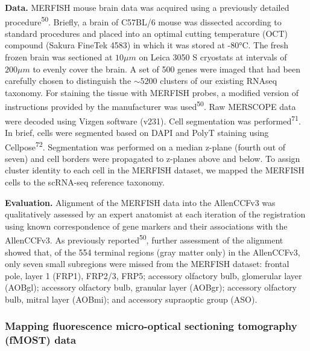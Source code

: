 \documentclass[
  12pt,
]{article}
\begin{document}
\textbf{Data.} MERFISH mouse brain data was acquired using a previously
detailed procedure\textsuperscript{50}. Briefly, a brain of C57BL/6
mouse was dissected according to standard procedures and placed into an
optimal cutting temperature (OCT) compound (Sakura FineTek 4583) in
which it was stored at -80°C. The fresh frozen brain was sectioned at
\(10 \mu m\) on Leica 3050 S cryostats at intervals of \(200 \mu m\) to
evenly cover the brain. A set of 500 genes were imaged that had been
carefully chosen to distinguish the \(\sim5200\) clusters of our
existing RNAseq taxonomy. For staining the tissue with MERFISH probes, a
modified version of instructions provided by the manufacturer was
used\textsuperscript{50}. Raw MERSCOPE data were decoded using Vizgen
software (v231). Cell segmentation was performed\textsuperscript{71}. In
brief, cells were segmented based on DAPI and PolyT staining using
Cellpose\textsuperscript{72}. Segmentation was performed on a median
z-plane (fourth out of seven) and cell borders were propagated to
z-planes above and below. To assign cluster identity to each cell in the
MERFISH dataset, we mapped the MERFISH cells to the scRNA-seq reference
taxonomy.

\textbf{Evaluation.} Alignment of the MERFISH data into the AllenCCFv3
was qualitatively assessed by an expert anatomist at each iteration of
the registration using known correspondence of gene markers and their
associations with the AllenCCFv3. As previously
reported\textsuperscript{50}, further assessment of the alignment showed
that, of the 554 terminal regions (gray matter only) in the AllenCCFv3,
only seven small subregions were missed from the MERFISH dataset:
frontal pole, layer 1 (FRP1), FRP2/3, FRP5; accessory olfactory bulb,
glomerular layer (AOBgl); accessory olfactory bulb, granular layer
(AOBgr); accessory olfactory bulb, mitral layer (AOBmi); and accessory
supraoptic group (ASO).

\subsubsection{Mapping fluorescence micro-optical sectioning tomography
(fMOST)
data}\label{mapping-fluorescence-micro-optical-sectioning-tomography-fmost-data}
\end{document}
